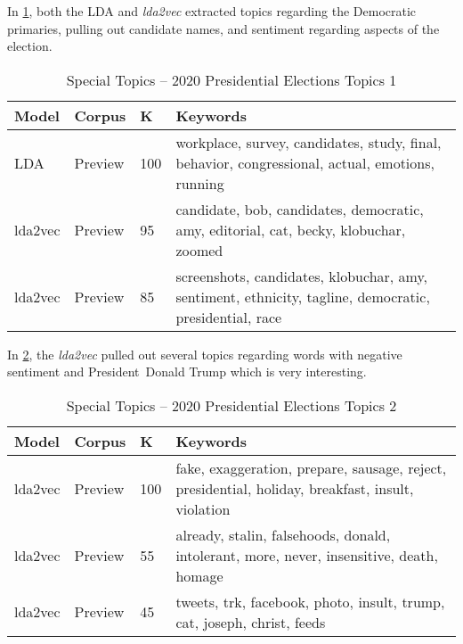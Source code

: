 \documentclass[letterpaper,12pt]{article}
\begin{document}
In \ref{tab:dem_cand}, both the LDA and \emph{lda2vec} extracted topics regarding the Democratic primaries,
pulling out candidate names, and sentiment regarding aspects of the election.
\begin{table}
	\caption{\label{tab:dem_cand} Special Topics -- 2020 Presidential Elections Topics 1}
	\begin{center}
	\begin{tabular}{|l|l|l|p{10cm}|}
		\hline
			\textbf{Model} &   \textbf{Corpus} &    \textbf{K} &                                                                                                \textbf{Keywords} \\
		\hline
				LDA &  Preview &  100 &         workplace, survey, candidates, study, final, behavior, congressional, actual, emotions, running \\
		\hline
				lda2vec &  Preview &   95 &                   candidate, bob, candidates, democratic, amy, editorial, cat, becky, klobuchar, zoomed \\
		\hline
				lda2vec &  Preview &   85 &  screenshots, candidates, klobuchar, amy, sentiment, ethnicity, tagline, democratic, presidential, race \\
		\hline
	\end{tabular}
\end{center}
\end{table}

In \ref{tab:trump}, the \emph{lda2vec} pulled out several topics regarding words with negative sentiment and President\
Donald Trump which is very interesting.
\begin{table}
	\caption{\label{tab:trump} Special Topics -- 2020 Presidential Elections Topics 2}
	\begin{center}
	\begin{tabular}{|l|l|l|p{10cm}|}
		\hline
			\textbf{Model} &   \textbf{Corpus} &    \textbf{K} &                                                                                           \textbf{Keywords} \\
		\hline
		lda2vec &  Preview &  100 &  fake, exaggeration, prepare, sausage, reject, presidential, holiday, breakfast, insult, violation \\
		\hline
		lda2vec &  Preview &   55 &           already, stalin, falsehoods, donald, intolerant, more, never, insensitive, death, homage \\
		\hline
		lda2vec &  Preview &   45 &                            tweets, trk, facebook, photo, insult, trump, cat, joseph, christ, feeds \\
		\hline
	\end{tabular}
\end{center}
\end{table}
\end{document}
